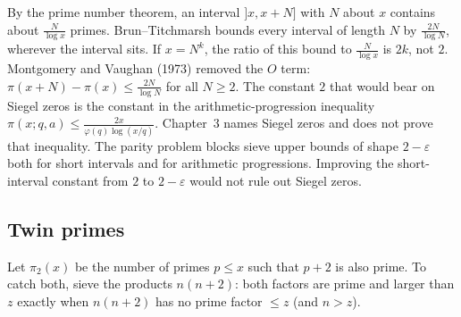 By the prime number theorem, an interval $]x,x+N]$ with $N$ about $x$ contains about $\frac N{\log x}$ primes. Brun--Titchmarsh bounds every interval of length $N$ by $\frac{2N}{\log N}$, wherever the interval sits. If $x=N^k$, the ratio of this bound to $\frac N{\log x}$ is $2k$, not $2$. Montgomery and Vaughan (1973) removed the $O$ term: $\pi(x+N)-\pi(x)\le\frac{2N}{\log N}$ for all $N\ge2$. The constant $2$ that would bear on Siegel zeros is the constant in the arithmetic-progression inequality $\pi(x;q,a)\le\frac{2x}{\varphi(q)\log(x/q)}$. Chapter~3 names Siegel zeros and does not prove that inequality. The parity problem blocks sieve upper bounds of shape $2-\varepsilon$ both for short intervals and for arithmetic progressions. Improving the short-interval constant from $2$ to $2-\varepsilon$ would not rule out Siegel zeros.

\subsection*{Twin primes}

Let $\pi_2(x)$ be the number of primes $p\le x$ such that $p+2$ is also prime. To catch both, sieve the products $n(n+2)$: both factors are prime and larger than $z$ exactly when $n(n+2)$
has no prime factor $\le z$ (and $n>z$).

